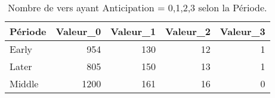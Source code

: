 \begin{table}[H]

\caption{Nombre de vers ayant Anticipation = 0,1,2,3 selon la Période.}
\centering
\begin{tabular}[t]{lrrrr}
\toprule
Période & Valeur\_0 & Valeur\_1 & Valeur\_2 & Valeur\_3\\
\midrule
Early & 954 & 130 & 12 & 1\\
Later & 805 & 150 & 13 & 1\\
Middle & 1200 & 161 & 16 & 0\\
\bottomrule
\end{tabular}
\end{table}